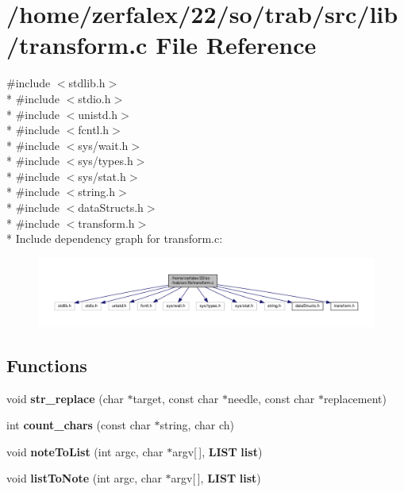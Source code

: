 \section{/home/zerfalex/22/so/trab/src/lib/transform.c File Reference}
\label{transform_8c}
{\ttfamily \#include $<$stdlib.\+h$>$}\\*
{\ttfamily \#include $<$stdio.\+h$>$}\\*
{\ttfamily \#include $<$unistd.\+h$>$}\\*
{\ttfamily \#include $<$fcntl.\+h$>$}\\*
{\ttfamily \#include $<$sys/wait.\+h$>$}\\*
{\ttfamily \#include $<$sys/types.\+h$>$}\\*
{\ttfamily \#include $<$sys/stat.\+h$>$}\\*
{\ttfamily \#include $<$string.\+h$>$}\\*
{\ttfamily \#include $<$data\+Structs.\+h$>$}\\*
{\ttfamily \#include $<$transform.\+h$>$}\\*
Include dependency graph for transform.\+c\+:\nopagebreak
\begin{figure}[H]
\begin{center}
\leavevmode
\includegraphics[width=350pt]{transform_8c__incl}
\end{center}
\end{figure}
\subsection*{Functions}
\begin{DoxyCompactItemize}
\item 
void {\bf str\+\_\+replace} (char $\ast$target, const char $\ast$needle, const char $\ast$replacement)
\item 
int {\bf count\+\_\+chars} (const char $\ast$string, char ch)
\item 
void {\bf note\+To\+List} (int argc, char $\ast$argv[$\,$], {\bf L\+I\+ST} {\bf list})
\item 
void {\bf list\+To\+Note} (int argc, char $\ast$argv[$\,$], {\bf L\+I\+ST} {\bf list})
\end{DoxyCompactItemize}


